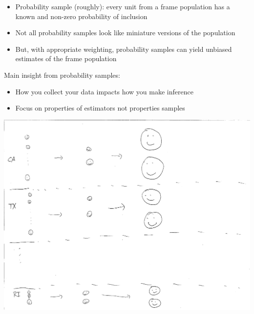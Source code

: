 \documentclass[aspectratio=169]{beamer}
\begin{document}
\begin{frame}

\begin{itemize}
\item Probability sample (roughly): every unit from a frame population has a known and non-zero probability of inclusion
\pause
\item Not all probability samples look like miniature versions of the population
\pause
\item But, with appropriate weighting, probability samples can yield unbiased estimates of the frame population
\end{itemize}

\end{frame}
\begin{frame}

Main insight from probability samples:\\
\begin{itemize}
\item How you collect your data impacts how you make inference
\item Focus on properties of estimators not properties samples
\end{itemize}

\end{frame}
\begin{frame}

\begin{center}
\includegraphics[height=\textheight]{figures/stratified_sampling_cps}
\end{center}

\end{frame}
\end{document}
